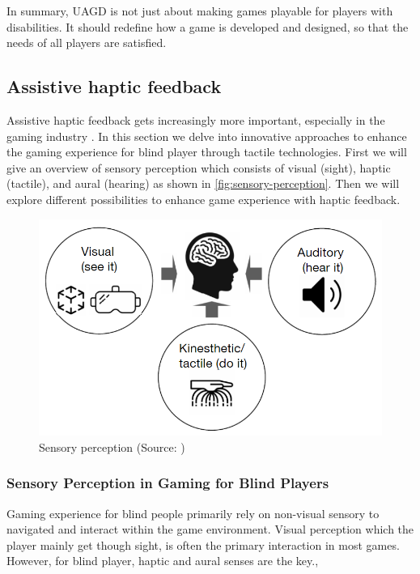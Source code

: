 \documentclass[sigconf,natbib=false,10pt]{acmart}
\begin{document}
	In summary, UAGD is not just about making games playable for players with disabilities.
	It should redefine how a game is developed and designed, so that the needs of all players are satisfied.
	
	\subsection{Assistive haptic feedback} \label{subsec:assistiveHapticFeedback}
	Assistive haptic feedback gets increasingly more important, especially in the gaming industry \cite{kuber_towards_2007}.
	In this section we delve into innovative approaches to enhance the gaming experience for blind player through tactile technologies.
	First we will give an overview of sensory perception which consists of visual (sight), haptic (tactile), and aural (hearing) as shown in \autoref{fig:sensory-perception}.
	Then we will explore different possibilities to enhance game experience with haptic feedback.
	
	\begin{figure}[ht]
		\centering
		\includegraphics[scale=0.4]{assets/sensory-perception.png}
		\caption{Sensory perception (Source: \textcite{sanfilippo_perspective_2022})}
		\label{fig:sensory-perception}
	\end{figure}
	
	\subsubsection{Sensory Perception in Gaming for Blind Players}
	Gaming experience for blind people primarily rely on non-visual sensory to navigated and interact within the game environment.
	Visual perception which the player mainly get though sight, is often the primary interaction in most games.
	However, for blind player, haptic and aural senses are the key.,
	
\end{document}
